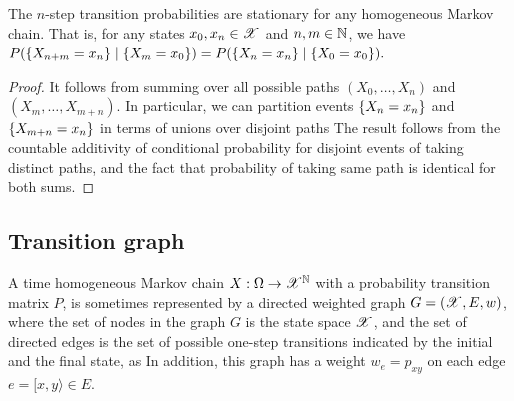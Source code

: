 \documentclass[letterpaper,10pt,english]{article}
\begin{document}
\begin{cor}
The $n$-step transition probabilities are stationary for any homogeneous Markov chain.  
That is,  for any states $x_0,x_n \in \mathscr{X}$ and $n,m \in \mathbb{N}$, we have 
$
P(\left\{X_{n+m} = x_n\right\}\mid\left\{ X_m = x_0\right\}) 
=  P(\left\{X_{n} = x_n\right\}\mid\left\{ X_0 = x_0\right\}). 
$
\end{cor}
\begin{proof}
It follows from summing over all possible paths $(X_0, \dots, X_n)$ and $(X_m, \dots, X_{m+n})$. 
In particular, we can partition events $\left\{X_n=x_n\right\}$ and $\left\{X_{m+n}=x_n\right\}$ in terms of unions over disjoint paths 
The result follows from the countable additivity of conditional probability for disjoint events of taking distinct paths, 
and the fact that probability of taking same path is identical for both sums. 
\end{proof}
\subsection{Transition graph} 
A time homogeneous Markov chain $X: \Omega\to\mathscr{X}^{\mathbb{N}}$ with a probability transition matrix $P$, 
is sometimes represented by a directed weighted graph $G = (\mathscr{X}, E, w)$, where the set of nodes in the graph $G$ is the state space $\mathscr{X}$, and the set of directed edges is the set of possible one-step transitions indicated by the initial and the final state, as 
\EQ{
E \triangleq \set{[x,y\rangle \in \sX \times \sX : p_{xy} > 0}. 
}
In addition, this graph has a weight $w_e = p_{xy}$ on each edge $e = [x,y\rangle \in E$. 
\end{document}
